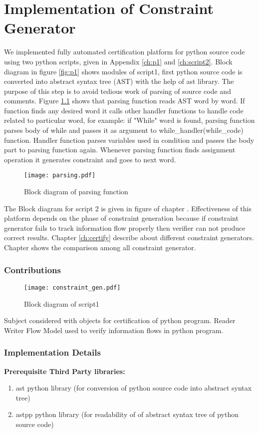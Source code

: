 \chapter{Implementation of Constraint Generator}
We implemented fully automated certification platform for python source code  using two python scripts, given in Appendix \ref{ch:p1} and \ref{ch:script2}. Block diagram in figure \ref{fig:p1} shows modules of script1, first python source code is converted into abstract syntax tree (AST) with the help of ast library. The purpose of this step is to avoid tedious work of parsing of source code and comments. Figure \ref{fig:parsing} shows that parsing function reads AST word by word. If function finds any desired word it calls other handler functions to handle code related to particular word, for example: if "While" word is found, parsing function parses body of while and passes it as argument to while\_handler(while\_code) function. Handler function parses variables used in condition and passes the body part to parsing function again. Whenever parsing function finds assignment operation it generates constraint and goes to next word.     
\begin{figure}
	\texttt{[image: parsing.pdf]}
	\centering
	\caption{Block diagram of parsing function}
	\label{fig:parsing}
\end{figure}
	The Block diagram for script 2 is given in figure  of chapter . 
	Effectiveness of this platform depends on the phase of constraint generation because if constraint generator fails to track information flow properly then verifier can not produce correct results. Chapter \ref{ch:certify} describe about different constraint generators. Chapter  shows the comparison among all constraint generator.  
	
	\subsection{Contributions}
	\begin{figure}
		\texttt{[image: constraint\_gen.pdf]}
		\centering
		\caption{Block diagram of script1}
		\label{fig:script1}
	\end{figure}
	Subject considered with objects for certification of python program. Reader Writer Flow Model \cite{rwfm} used to verify information flows in python program.
	\subsection{Implementation Details}
	\textbf{Prerequisite Third Party libraries:}
	\begin{enumerate}
		\item ast python library (for conversion of python source code into abstract syntax tree)
		\item astpp python library (for readability of of abstract syntax tree of python source code)
	\end{enumerate}
